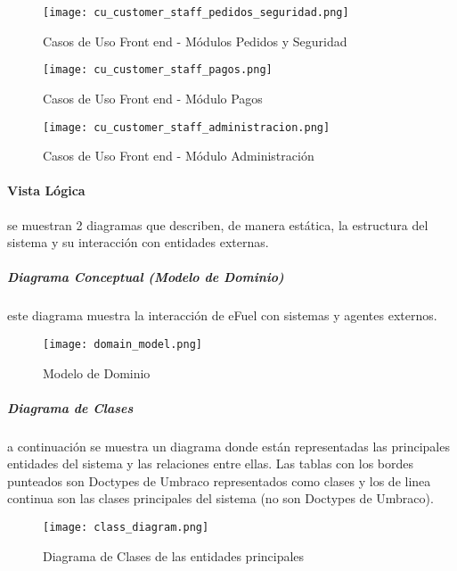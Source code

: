\newpage
{}
\vspace*{\fill}
\begin{figure}[H]
    \centering
    \texttt{[image: cu\_customer\_staff\_pedidos\_seguridad.png]}
    \caption{Casos de Uso Front end - Módulos Pedidos y Seguridad}
    \label{fig:cu_customer_staff_pedidos}
\end{figure}
\vspace*{\fill}

\newpage
{}
\vspace*{\fill}
\begin{figure}[H]
    \centering
    \texttt{[image: cu\_customer\_staff\_pagos.png]}
    \caption{Casos de Uso Front end - Módulo Pagos}
    \label{fig:cu_customer_staff_pagos}
\end{figure}
\vspace*{\fill}

\newpage
\begin{figure}[H]
    \centering
    \texttt{[image: cu\_customer\_staff\_administracion.png]}
    \caption{Casos de Uso Front end - Módulo Administración}
    \label{fig:cu_customer_staff_administracion}
\end{figure}

\paragraph{Vista Lógica} se muestran 2 diagramas que describen, de manera estática, la estructura del sistema y su interacción con entidades externas.

\subparagraph*{Diagrama Conceptual (Modelo de Dominio)} este diagrama muestra la interacción de eFuel con sistemas y agentes externos.
\begin{figure}[H]
    \texttt{[image: domain\_model.png]}
    \caption{Modelo de Dominio}
    \label{fig:domain_model}
    \centering
\end{figure}

\subparagraph*{Diagrama de Clases} a continuación se muestra un diagrama donde están representadas las principales entidades del sistema y las relaciones entre ellas. Las tablas con los bordes punteados son Doctypes de Umbraco representados como clases y los de linea continua son las clases principales del sistema (no son Doctypes de Umbraco).

\begin{figure}[H]
    \centering
    \texttt{[image: class\_diagram.png]}
    \caption{Diagrama de Clases de las entidades principales}
    \label{fig:class_diagram_main}
\end{figure}

